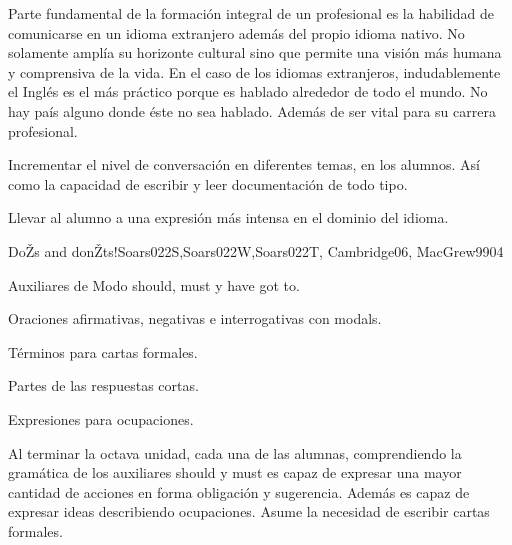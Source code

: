 \begin{syllabus}


\begin{justification}
Parte fundamental de la formación integral de un profesional es la habilidad 
de comunicarse en un idioma extranjero además del propio idioma nativo. 
No solamente amplía su horizonte cultural sino que permite una visión 
más humana y comprensiva de la vida. En el caso de los idiomas extranjeros, 
indudablemente el Inglés es el más práctico porque es hablado alrededor de 
todo el mundo. No hay país alguno donde éste no sea hablado. Además de ser 
vital para su carrera profesional.
\end{justification}

\begin{goals}
\item Incrementar el nivel de conversación en diferentes temas, en los alumnos. Así como la capacidad de escribir y leer documentación de todo tipo.
\item Llevar al alumno a una expresión más intensa en el dominio del idioma.
\end{goals}

\begin{outcomes}
\end{outcomes}

\begin{unit}{DoŽs and donŽts!}{Soars022S,Soars022W,Soars022T, Cambridge06, MacGrew99}{0}{4}
   \begin{topics}
      \item Auxiliares de Modo should, must y have got to.
      \item Oraciones afirmativas, negativas e interrogativas con modals.
      \item Términos para cartas formales.
      \item Partes de las respuestas cortas.
      \item Expresiones para ocupaciones.
   \end{topics}

   \begin{unitgoals}
      \item Al terminar la octava unidad, cada una de las alumnas, comprendiendo la gramática de los auxiliares should y must  es capaz de expresar una mayor cantidad de acciones en forma obligación y sugerencia.  Además es capaz de expresar ideas describiendo ocupaciones.  Asume la necesidad de escribir cartas formales. 
   \end{unitgoals}
\end{unit}


\end{syllabus}
